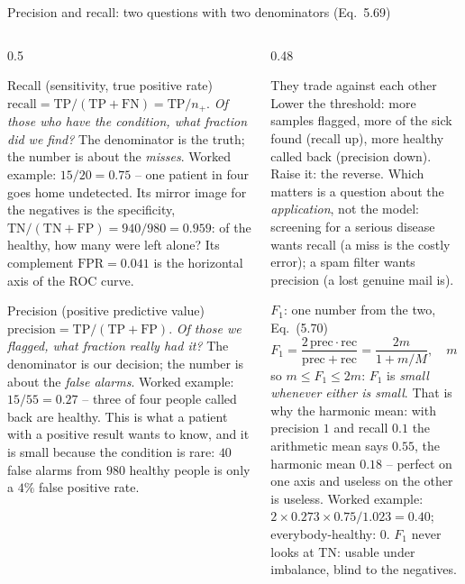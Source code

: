 \documentclass[10pt,aspectratio=169]{beamer}
\begin{document}
\begin{frame}{Precision and recall: two questions with two denominators (Eq.~5.69)}
\small
\begin{columns}[T]
\begin{column}{0.5\textwidth}
\begin{block}{Recall (sensitivity, true positive rate)}
\scriptsize
$\mathrm{recall}=\mathrm{TP}/(\mathrm{TP}+\mathrm{FN})=\mathrm{TP}/n_+$.
\emph{Of those who have the condition, what fraction did we find?}  The
denominator is the truth; the number is about the \emph{misses}.  Worked
example: $15/20=0.75$ -- one patient in four goes home undetected.  Its
mirror image for the negatives is the specificity,
$\mathrm{TN}/(\mathrm{TN}+\mathrm{FP})=940/980=0.959$: of the healthy, how
many were left alone?  Its complement $\mathrm{FPR}=0.041$ is the
horizontal axis of the ROC curve.
\end{block}
\begin{block}{Precision (positive predictive value)}
\scriptsize
$\mathrm{precision}=\mathrm{TP}/(\mathrm{TP}+\mathrm{FP})$.
\emph{Of those we flagged, what fraction really had it?}  The denominator
is our decision; the number is about the \emph{false alarms}.  Worked
example: $15/55=0.27$ -- three of four people called back are healthy.
This is what a patient with a positive result wants to know, and it is
small because the condition is rare: $40$ false alarms from $980$ healthy
people is only a $4\%$ false positive rate.
\end{block}
\end{column}
\begin{column}{0.48\textwidth}
\begin{block}{They trade against each other}
\scriptsize
Lower the threshold: more samples flagged, more of the sick found (recall
up), more healthy called back (precision down).  Raise it: the reverse.
Which matters is a question about the \emph{application}, not the model:
screening for a serious disease wants recall (a miss is the costly
error); a spam filter wants precision (a lost genuine mail is).
\end{block}
\begin{block}{$F_1$: one number from the two, Eq.~(5.70)}
\scriptsize
\[
  F_1=\frac{2\,\mathrm{prec}\cdot\mathrm{rec}}{\mathrm{prec}+\mathrm{rec}}
  =\frac{2m}{1+m/M},\quad m=\min,\ M=\max,
\]
so $m\le F_1\le 2m$: $F_1$ is \emph{small whenever either is small}.
That is why the harmonic mean: with precision $1$ and recall $0.1$ the
arithmetic mean says $0.55$, the harmonic mean $0.18$ -- perfect on one
axis and useless on the other is useless.  Worked example:
$2\times0.273\times0.75/1.023=0.40$; everybody-healthy: $0$.  $F_1$ never
looks at TN: usable under imbalance, blind to the negatives.
\end{block}
\end{column}
\end{columns}
\end{frame}
\end{document}
